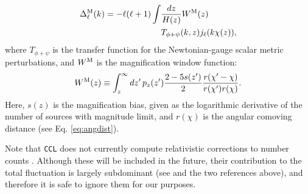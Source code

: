 \documentclass[\docopts]{\docclass}
\newcommand{\ccl}{{\tt CCL}\xspace}
\begin{document}
\begin{itemize}
        \begin{align}\nonumber
          \Delta_\ell^{\rm M}(k)=-\ell(\ell+1)\int & \frac{dz}{H(z)} W^{\rm M}(z) \\\label{eq:deltaM}
          &T_{\phi+\psi}(k,z) j_\ell(k\chi(z)),
        \end{align}
        where $T_{\phi+\psi}$ is the transfer function for the Newtonian-gauge scalar metric perturbations, and $W^{\rm M}$ is the magnification window function:
        \begin{equation}
          W^{\rm M}(z)\equiv\int_z^\infty dz'\,p_z(z')\frac{2-5s(z')}{2}\frac{r(\chi'-\chi)}{r(\chi')r(\chi)}.
        \end{equation}
        Here, $s(z)$ is the magnification bias, given as the logarithmic derivative of the number of sources with magnitude limit, and $r(\chi)$ is the angular comoving distance (see Eq. \ref{eq:angdist}).
\end{itemize}
Note that \ccl does not currently compute relativistic corrections to number counts \citep{2011PhRvD..84d3516C,2011PhRvD..84f3505B}. Although these will be included in the future, their contribution to the total fluctuation is largely subdominant (see \cite{GReffects} and the two references above), and therefore it is safe to ignore them for our purposes.
\end{document}
